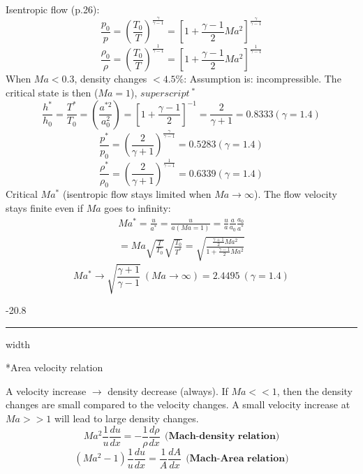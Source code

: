 \documentclass[8pt, landscape, fleqn]{scrartcl}
\makeatletter
\renewcommand{\subsubsection}{\@startsection{subsubsection}{1}{0mm}%
{-2\baselineskip}{0.8\baselineskip}%
{\hrule depth 0.2pt width\columnwidth\vspace*{1.2em}\normalsize\bfseries\rmfamily}}
\makeatother
\begin{document}
\begin{multicols*}{3}
Isentropic flow (p.26):
\begin{equation}
    \frac{p_0}{p} = \left( \frac{T_0}{T}\right)^{\frac{\gamma}{\gamma -1}} = \left[ 1 + \frac{\gamma-1}{2} Ma^2 \right]^{\frac{\gamma}{\gamma-1}}
\end{equation}
\begin{equation}
    \frac{\rho_0}{\rho} = \left( \frac{T_0}{T} \right)^{\frac{1}{\gamma-1}} = \left[ 1 + \frac{\gamma-1}{2} Ma^2 \right]^{\frac{1}{\gamma-1}}
\end{equation}
When $Ma < 0.3$, density changes $< 4.5 \%$: Assumption is: incompressible. The critical state is then ($Ma = 1$), $superscript~^*$
\begin{equation*}
    \frac{h^*}{h_0} = \frac{T^*}{T_0} = \left( \frac{a^{*2}}{a_0^2}\right) = \left[ 1 + \frac{\gamma -1 }{2}\right]^{-1} = \frac{2}{\gamma+1} = 0.8333 (\gamma = 1.4)
\end{equation*}
\begin{equation}
    \frac{p^*}{p_0} = \left( \frac{2}{\gamma+1} \right)^{\frac{\gamma}{\gamma-1}} = 0.5283 (\gamma = 1.4)
\end{equation}
\begin{equation}
    \frac{\rho^*}{\rho_0} = \left( \frac{2}{\gamma+1} \right)^{\frac{1}{\gamma-1}} = 0.6339 (\gamma = 1.4)
\end{equation}
Critical $Ma^*$ (isentropic flow stays limited when $Ma \rightarrow \infty$). The flow velocity stays finite even if $Ma$ goes to infinity:
\begin{align}
    Ma^* = \frac{u}{a^*} = \frac{u}{a(Ma=1)} = \frac{u}{a}\frac{a}{a_0}\frac{a_0}{a^*} \\
    = Ma \sqrt{\frac{T}{T_0}}\sqrt{\frac{T_0}{T^*}} = \sqrt{\frac{\frac{\gamma+1}{2}Ma^2}{1+\frac{\gamma-1}{2}Ma^2}}
\end{align}
\begin{equation}
    Ma^* \rightarrow \sqrt{\frac{\gamma+1}{\gamma-1}}~(Ma \rightarrow \infty) = 2.4495~(\gamma = 1.4)
\end{equation}

\subsubsection*{Area velocity relation}

A velocity increase $\rightarrow$ density decrease (always). If $Ma << 1$, then the density changes are small compared to the velocity changes. A small velocity increase at $Ma >> 1$ will lead to large density changes.
\begin{equation}
    Ma^2 \frac{1}{u} \frac{d u}{d x} = -\frac{1}{\rho} \frac{d \rho}{d x}~~\textbf{(Mach-density relation)}
\end{equation}
\begin{equation}
    \left( Ma^2 -1 \right) \frac{1}{u} \frac{d u}{d x} = \frac{1}{A} \frac{d A}{d x}~~\textbf{(Mach-Area relation)}
\end{equation}


\end{multicols*}
\end{document}

